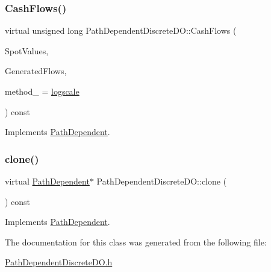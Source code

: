 \subsubsection{\texorpdfstring{Cash\+Flows()}{CashFlows()}}
{\footnotesize\ttfamily virtual unsigned long Path\+Dependent\+Discrete\+D\+O\+::\+Cash\+Flows (\begin{DoxyParamCaption}\item[{const \hyperlink{classMJArray}{M\+J\+Array} \&}]{Spot\+Values,  }\item[{std\+::vector$<$ \hyperlink{classMyCashFlow_1_1CashFlow}{My\+Cash\+Flow\+::\+Cash\+Flow} $>$ \&}]{Generated\+Flows,  }\item[{\hyperlink{PathDependent_8h_abed946c62f140eb7ff2ac742e6ad9497}{method}}]{method\+\_\+ = {\ttfamily \hyperlink{PathDependent_8h_abed946c62f140eb7ff2ac742e6ad9497a064d3d3358889658ce07fe9f3191d1fd}{logscale}} }\end{DoxyParamCaption}) const\hspace{0.3cm}{\ttfamily [virtual]}}



Implements \hyperlink{classPathDependent_a5d5b1d6ecf9dc6be128fff9694f589c8}{Path\+Dependent}.

\hypertarget{classPathDependentDiscreteDO_a3de80a8fddb9ef29bf3ed6e97004fc0c}{}\label{classPathDependentDiscreteDO_a3de80a8fddb9ef29bf3ed6e97004fc0c} 
\subsubsection{\texorpdfstring{clone()}{clone()}}
{\footnotesize\ttfamily virtual \hyperlink{classPathDependent}{Path\+Dependent}$\ast$ Path\+Dependent\+Discrete\+D\+O\+::clone (\begin{DoxyParamCaption}{ }\end{DoxyParamCaption}) const\hspace{0.3cm}{\ttfamily [virtual]}}



Implements \hyperlink{classPathDependent_afcc10647f591175642c6dc0adba23f0b}{Path\+Dependent}.



The documentation for this class was generated from the following file\+:\begin{DoxyCompactItemize}
\item 
\hyperlink{PathDependentDiscreteDO_8h}{Path\+Dependent\+Discrete\+D\+O.\+h}\end{DoxyCompactItemize}
